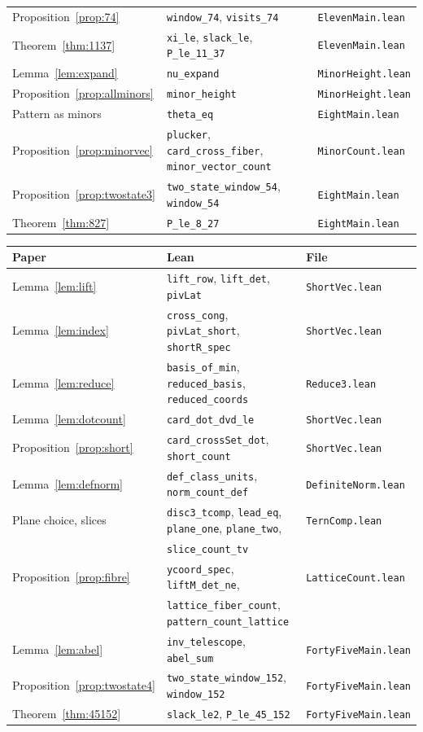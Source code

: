 \documentclass[11pt]{amsart}
\theoremstyle{definition}
\theoremstyle{remark}
\newcommand{\lean}[1]{\texttt{#1}}
\begin{document}
\begin{center}
\begin{tabular}{@{}lll@{}}
Proposition~\ref{prop:74} & \lean{window\_74}, \lean{visits\_74} & \lean{ElevenMain.lean}\\
Theorem~\ref{thm:1137} & \lean{xi\_le}, \lean{slack\_le}, \lean{P\_le\_11\_37} & \lean{ElevenMain.lean}\\
Lemma~\ref{lem:expand} & \lean{nu\_expand} & \lean{MinorHeight.lean}\\
Proposition~\ref{prop:allminors} & \lean{minor\_height} & \lean{MinorHeight.lean}\\
Pattern as minors & \lean{theta\_eq} & \lean{EightMain.lean}\\
Proposition~\ref{prop:minorvec} & \lean{plucker}, \lean{card\_cross\_fiber}, \lean{minor\_vector\_count} & \lean{MinorCount.lean}\\
Proposition~\ref{prop:twostate3} & \lean{two\_state\_window\_54}, \lean{window\_54} & \lean{EightMain.lean}\\
Theorem~\ref{thm:827} & \lean{P\_le\_8\_27} & \lean{EightMain.lean}\\
\bottomrule
\end{tabular}
\end{center}

\begin{center}\footnotesize
\begin{tabular}{@{}lll@{}}
\toprule
Paper & Lean & File \\
\midrule
Lemma~\ref{lem:lift} & \lean{lift\_row}, \lean{lift\_det}, \lean{pivLat} & \lean{ShortVec.lean}\\
Lemma~\ref{lem:index} & \lean{cross\_cong}, \lean{pivLat\_short}, \lean{shortR\_spec} & \lean{ShortVec.lean}\\
Lemma~\ref{lem:reduce} & \lean{basis\_of\_min}, \lean{reduced\_basis}, \lean{reduced\_coords} & \lean{Reduce3.lean}\\
Lemma~\ref{lem:dotcount} & \lean{card\_dot\_dvd\_le} & \lean{ShortVec.lean}\\
Proposition~\ref{prop:short} & \lean{card\_crossSet\_dot}, \lean{short\_count} & \lean{ShortVec.lean}\\
Lemma~\ref{lem:defnorm} & \lean{def\_class\_units}, \lean{norm\_count\_def} & \lean{DefiniteNorm.lean}\\
Plane choice, slices & \lean{disc3\_tcomp}, \lean{lead\_eq}, \lean{plane\_one}, \lean{plane\_two}, & \lean{TernComp.lean}\\
 & \lean{slice\_count\_tv} & \\
Proposition~\ref{prop:fibre} & \lean{ycoord\_spec}, \lean{liftM\_det\_ne}, & \lean{LatticeCount.lean}\\
 & \lean{lattice\_fiber\_count}, \lean{pattern\_count\_lattice} & \\
Lemma~\ref{lem:abel} & \lean{inv\_telescope}, \lean{abel\_sum} & \lean{FortyFiveMain.lean}\\
Proposition~\ref{prop:twostate4} & \lean{two\_state\_window\_152}, \lean{window\_152} & \lean{FortyFiveMain.lean}\\
Theorem~\ref{thm:45152} & \lean{slack\_le2}, \lean{P\_le\_45\_152} & \lean{FortyFiveMain.lean}\\
\bottomrule
\end{tabular}
\end{center}
\end{document}
